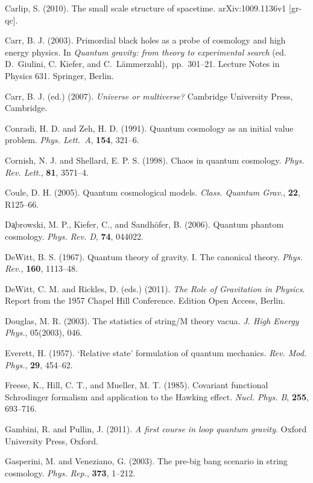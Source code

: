 \documentclass[12pt]{article}
\begin{document}
\bibitem{} Carlip, S. (2010). The small scale structure of
           spacetime. arXiv:1009.1136v1 [gr-qc].

\bibitem{} Carr, B. J. (2003). Primordial black holes as a probe
           of cosmology and high energy physics. In {\em Quantum 
           gravity: from theory to experimental search} (ed. D.~Giulini,
           C. Kiefer, and C.~L\"ammerzahl),~pp.~301--21. 
           Lecture Notes in Physics 631. Springer, Berlin.

\bibitem{} Carr, B. J. (ed.) (2007). {\em Universe or multiverse?}
           Cambridge University Press, Cambridge. 

\bibitem{} Conradi, H. D. and Zeh, H. D. (1991). Quantum cosmology as an
           initial value problem. {\em Phys. Lett.~A}, {\bf 154},
           321--6.

\bibitem{} Cornish, N. J. and Shellard, E. P. S. (1998).
           Chaos in quantum cosmology. {\em Phys. Rev. Lett.}, {\bf
             81}, 3571--4.

\bibitem{} Coule, D. H. (2005). Quantum cosmological models.
           {\em Class. Quantum Grav.}, {\bf 22}, R125--66. 

\bibitem{} D\c{a}browski, M. P., Kiefer, C., and Sandh\"ofer,
  B. (2006). Quantum phantom cosmology. {\em Phys. Rev. D}, {\bf 74},
  044022.

\bibitem{} DeWitt, B. S. (1967). Quantum theory of gravity. I.
           The canonical theory. {\em Phys. Rev.}, {\bf 160},
           1113--48.

\bibitem{} DeWitt, C. M. and Rickles, D. (eds.) (2011). {\em The Role
    of Gravitation in Physics}. Report from the 1957 Chapel Hill
  Conference. Edition Open Access, Berlin. 

\bibitem{} Douglas, M. R. (2003). The statistics of string/M theory vacua.
           {\em J. High Energy Phys.}, 05(2003), 046.

\bibitem{} Everett, H. (1957). `Relative state' formulation of
           quantum mechanics. {\em Rev. Mod. Phys.}, {\bf 29},
           454--62.

\bibitem{} Freese, K., Hill, C. T., and Mueller, M. T. (1985).       	
Covariant functional Schrodinger formalism and application to the
Hawking effect. {\em Nucl. Phys. B}, {\bf 255}, 693--716.  

\bibitem{} Gambini, R. and Pullin, J. (2011).
           {\em A first course in loop quantum gravity}.
           Oxford University Press, Oxford.

\bibitem{} Gasperini, M. and Veneziano, G. (2003). The pre-big bang
           scenario in string cosmology. {\em Phys. Rep.}, {\bf 373},
           1--212.
\end{document}
